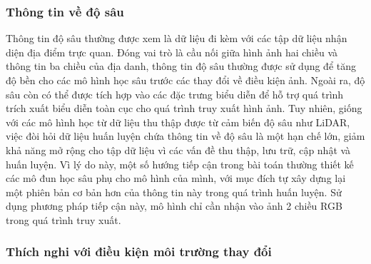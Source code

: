 \subsubsection{Thông tin về độ sâu}

Thông tin độ sâu thường được xem là dữ liệu đi kèm với các tập dữ liệu nhận diện địa điểm trực quan. Đóng vai trò là cầu nối giữa hình ảnh hai chiều và thông tin ba chiều của địa danh, thông tin độ sâu thường được sử dụng để tăng độ bền cho các mô hình học sâu trước các thay đổi về điều kiện ảnh. Ngoài ra, độ sâu còn có thể được tích hợp vào các đặc trưng biểu diễn để hỗ trợ quá trình trích xuất biểu diễn toàn cục cho quá trình truy xuất hình ảnh. Tuy nhiên, giống với các mô hình học từ dữ liệu thu thập được từ cảm biến độ sâu như LiDAR, việc đòi hỏi dữ liệu huấn luyện chứa thông tin về độ sâu là một hạn chế lớn, giảm khả năng mở rộng cho tập dữ liệu vì các vấn đề thu thập, lưu trữ, cập nhật và huấn luyện. Vì lý do này, một số hướng tiếp cận trong bài toán thường thiết kế các mô đun học sâu phụ cho mô hình của mình, với mục đích tự xây dựng lại một phiên bản cơ bản hơn của thông tin này trong quá trình huấn luyện. Sử dụng phương pháp tiếp cận này, mô hình chỉ cần nhận vào ảnh 2 chiều RGB trong quá trình truy xuất\cite{piasco2019learning}.

\subsubsection{Thích nghi với điều kiện môi trường thay đổi}

